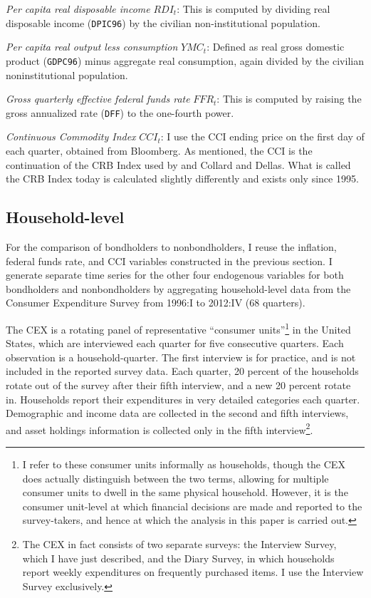 \textit{Per capita real disposable income} $RDI_t$: This is computed by dividing real disposable income (\texttt{DPIC96}) by the civilian non-institutional population.

\textit{Per capita real output less consumption} $YMC_t$: Defined as real gross domestic product (\texttt{GDPC96}) minus aggregate real consumption, again divided by the civilian noninstitutional population.

\textit{Gross quarterly effective federal funds rate} $FFR_t$: This is computed by raising the gross annualized rate (\texttt{DFF}) to the one-fourth power.

\textit{Continuous Commodity Index} $CCI_t$: I use the CCI ending price on the first day of each quarter, obtained from Bloomberg. As mentioned, the CCI is the continuation of the CRB Index used by \cite{canzoneri07} and Collard and Dellas. What is called the CRB Index today is calculated slightly differently and exists only since 1995.



\subsection{Household-level}
\label{cex-data}
For the comparison of bondholders to nonbondholders, I reuse the inflation, federal funds rate, and CCI variables constructed in the previous section. I generate separate time series for the other four endogenous variables for both bondholders and nonbondholders by aggregating household-level data from the Consumer Expenditure Survey from 1996:I to 2012:IV (68 quarters).

The CEX is a rotating panel of representative ``consumer units''\footnote{I refer to these consumer units informally as households, though the CEX does actually distinguish between the two terms, allowing for multiple consumer units to dwell in the same physical household. However, it is the consumer unit-level at which financial decisions are made and reported to the survey-takers, and hence at which the analysis in this paper is carried out.} in the United States, which are interviewed each quarter for five consecutive quarters. Each observation is a household-quarter. The first interview is for practice, and is not included in the reported survey data. Each quarter, 20 percent of the households rotate out of the survey after their fifth interview, and a new 20 percent rotate in. Households report their expenditures in very detailed categories each quarter. Demographic and income data are collected in the second and fifth interviews, and asset holdings information is collected only in the fifth interview\footnote{The CEX in fact consists of two separate surveys: the Interview Survey, which I have just described, and the Diary Survey, in which households report weekly expenditures on frequently purchased items. I use the Interview Survey exclusively.}.

